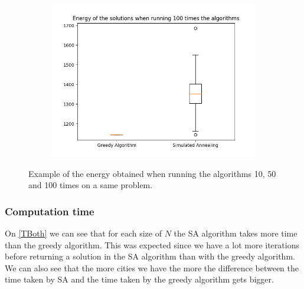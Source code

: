 \documentclass[14pt]
{article}
\begin{document}
\begin{figure}[H]
\begin{subfigure}{0.32\textwidth}
\includegraphics[width = \textwidth]{img/E50_100.png}
\end{subfigure}
\caption{\label{E50} Example of the energy obtained when running the algorithms 10, 50 and 100 times on a same problem.}
\end{figure}

\subsubsection{Computation time}

On \autoref{TBoth} we can see that for each size of $N$ the SA algorithm takes more time than the greedy algorithm. This was expected since we have a lot more iterations before returning a solution in the SA algorithm than with the greedy algorithm. We can also see that the more cities we have the more the difference between the time taken by SA and the time taken by the greedy algorithm gets bigger.
\end{document}

